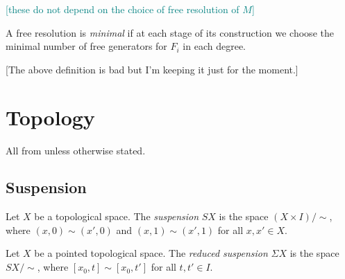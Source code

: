 \documentclass{MetricNotes2023}
\DeclareMathOperator{\Hom}{Hom}
\def\textcolour{\textcolor}
\begin{document}
\textcolour{teal}{[these do not depend on the choice of free resolution of \(M\)]}

A free resolution is \textit{minimal} if at each stage of its construction we choose the minimal number of free generators for \(F_i\) in each degree.

[The above definition is bad but I'm keeping it just for the moment.]




\section{Topology}

All from \autocite{hatcher} unless otherwise stated.

\subsection{Suspension}

\begin{definition}
Let \(X\) be a topological space. The \textit{suspension} \(SX\) is the space \newline\((X\times I)/\sim\), where \((x, 0)\sim (x', 0)\) and \((x,1)\sim (x',1)\) for all \(x,x'\in X\). 
\end{definition}

\begin{definition}
Let \(X\) be a pointed topological space. The \textit{reduced suspension} \(\Sigma X\) is the space \(SX/\sim\), where \([x_0, t]\sim [x_0, t']\) for all \(t,t'\in I\). 
\end{definition}
\end{document}
